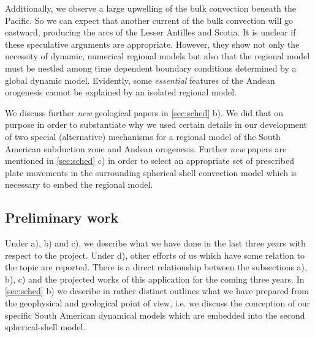 \documentclass[twoside,10pt]{article}
\begin{document}
Additionally, we observe a large upwelling of the bulk convection beneath the Pacific.
So we can expect that another current of the bulk convection will go eastward, producing the arcs of the Lesser Antilles and Scotia.
It is unclear if these speculative arguments are appropriate.
However, they show not only the necessity of dynamic, numerical regional models but also that the regional model must be nestled among time dependent boundary conditions determined by a global dynamic model.
Evidently, some \emph{essential} features of the Andean orogenesis cannot be explained by an isolated regional model.

We discuss further \emph{new} geological papers in \ref{sec:sched} b).
We did that on purpose in order to substantiate why we used certain details in our development of two special (alternative) mechanisms for a regional model of the South American subduction zone and Andean orogenesis.
Further \emph{new} papers are mentioned in \ref{sec:sched} c) in order to select an appropriate set of prescribed plate movements in the surrounding spherical-shell convection model which is necessary to embed the regional model.

\subsection{Preliminary work}
\label{sec:prelim}
Under a), b) and c), we describe what we have done in the last three years with respect to the project.
Under d), other efforts of us which have some relation to the topic are reported. 
There is a direct relationship between the subsections a), b), c) and the projected works of this application for the coming three years.
In \ref{sec:sched} b) we describe in rather distinct outlines what we have prepared from the geophysical and geological point of view, i.e. we discuss the conception of our specific South American dynamical models which are embedded into the second spherical-shell model.
\end{document}
